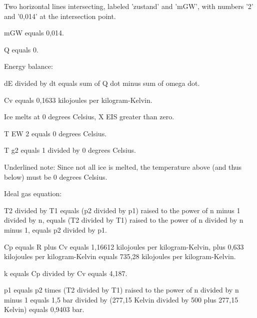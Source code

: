 Two horizontal lines intersecting, labeled 'zustand' and 'mGW', with numbers '2' and '0,014' at the intersection point.

mGW equals 0,014.

Q equals 0.

Energy balance:

dE divided by dt equals sum of Q dot minus sum of omega dot.

Cv equals 0,1633 kilojoules per kilogram-Kelvin.

Ice melts at 0 degrees Celsius, X EIS greater than zero.

T EW 2 equals 0 degrees Celsius.

T g2 equals 1 divided by 0 degrees Celsius.

Underlined note: Since not all ice is melted, the temperature above (and thus below) must be 0 degrees Celsius.

Ideal gas equation:

T2 divided by T1 equals (p2 divided by p1) raised to the power of n minus 1 divided by n, equals (T2 divided by T1) raised to the power of n divided by n minus 1, equals p2 divided by p1.

Cp equals R plus Cv equals 1,16612 kilojoules per kilogram-Kelvin, plus 0,633 kilojoules per kilogram-Kelvin equals 735,28 kilojoules per kilogram-Kelvin.

k equals Cp divided by Cv equals 4,187.

p1 equals p2 times (T2 divided by T1) raised to the power of n divided by n minus 1 equals 1,5 bar divided by (277,15 Kelvin divided by 500 plus 277,15 Kelvin) equals 0,9403 bar.